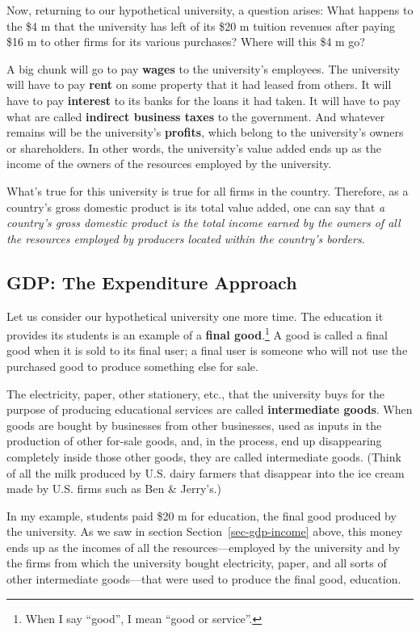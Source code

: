 \documentclass[
  letterpaper,
]{book}
\theoremstyle{plain}
\theoremstyle{remark}
\begin{document}
Now, returning to our hypothetical university, a question arises: What
happens to the \$4 m that the university has left of its \$20 m tuition
revenues after paying \$16 m to other firms for its various purchases?
Where will this \$4 m go?

A big chunk will go to pay \textbf{wages} to the university's employees.
The university will have to pay \textbf{rent} on some property that it
had leased from others. It will have to pay \textbf{interest} to its
banks for the loans it had taken. It will have to pay what are called
\textbf{indirect business taxes} to the government. And whatever remains
will be the university's \textbf{profits}, which belong to the
university's owners or shareholders. In other words, the university's
value added ends up as the income of the owners of the resources
employed by the university.

What's true for this university is true for all firms in the country.
Therefore, as a country's gross domestic product is its total value
added, one can say that \emph{a country's gross domestic product is the
total income earned by the owners of all the resources employed by
producers located within the country's borders}.

\subsection{GDP: The Expenditure Approach}\label{sec-gdp-expenditure}

Let us consider our hypothetical university one more time. The education
it provides its students is an example of a \textbf{final
good}.\footnote{When I say ``good'', I mean ``good or service''.} A good
is called a final good when it is sold to its final user; a final user
is someone who will not use the purchased good to produce something else
for sale.

The electricity, paper, other stationery, etc., that the university buys
for the purpose of producing educational services are called
\textbf{intermediate goods}. When goods are bought by businesses from
other businesses, used as inputs in the production of other for-sale
goods, and, in the process, end up disappearing completely inside those
other goods, they are called intermediate
goods. (Think of all the milk produced by U.S.
dairy farmers that disappear into the ice cream made by U.S. firms such
as Ben \& Jerry's.)

In my example, students paid \$20 m for education, the final good
produced by the university. As we saw in section
Section~\ref{sec-gdp-income} above, this money ends up as the incomes of
all the resources---employed by the university and by the firms from
which the university bought electricity, paper, and all sorts of other
intermediate goods---that were used to produce the final good,
education.
\end{document}
